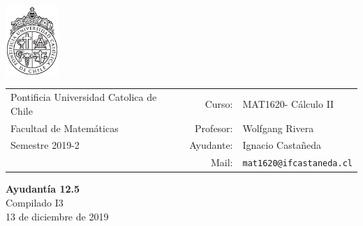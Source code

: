 \documentclass[12pt]{article}
\makeatletter
\newcommand{\ayudantia}{{\sc Ayudantía 12.5}}
\newcommand{\tituloayu}{Compilado I3}
\newcommand{\fecha}{13 de diciembre de 2019}
\newcommand{\sigla}{MAT1620}
\newcommand{\nombre}{Cálculo II}
\newcommand{\profesor}{Wolfgang Rivera}
\newcommand{\ano}{2019}
\newcommand{\semestre}{2}
\newcommand{\mail}{mat1620@ifcastaneda.cl}
\makeatother
\begin{document}
\thispagestyle{empty}

\begin{minipage}{2cm}
	\includegraphics[width=2cm]{../../../../img/logo.pdf}
	\vspace{0.5cm}
\end{minipage}
\begin{minipage}{\linewidth}
	\begin{tabular}{lrl}
		{\scriptsize\sc Pontificia Universidad Catolica de Chile} & \hspace*{0.7in}Curso: &
		\sigla  - \nombre\\
		{\sc Facultad de Matemáticas}&
		Profesor: & \profesor \\
		{\sc Semestre \ano-\semestre} & Ayudante: & {Ignacio Castañeda}\\
		& {Mail:} & \texttt{\mail}
	\end{tabular}
\end{minipage}

\vspace{-10mm}
\begin{center}
	{\LARGE\bf \ayudantia}\\
	\vspace{0.1cm}
	{\tituloayu}\\
	\vspace{0.1cm}
	\fecha\\
	\vspace{0.4cm}
\end{center}
\end{document}
